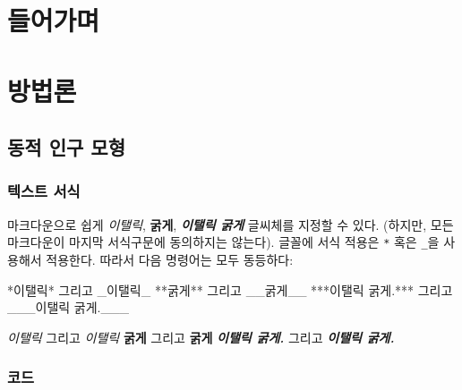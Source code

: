 \documentclass[
  letterpaper,
]{book}
\newenvironment{Shaded}{\begin{snugshade}}{\end{snugshade}}
\newcommand{\AttributeTok}[1]{\textcolor[rgb]{0.40,0.45,0.13}{#1}}
\newcommand{\OtherTok}[1]{\textcolor[rgb]{0.00,0.23,0.31}{#1}}
\begin{document}
\hypertarget{uxb4e4uxc5b4uxac00uxba70}{%
\chapter*{들어가며}\label{uxb4e4uxc5b4uxac00uxba70}}


\hypertarget{uxbc29uxbc95uxb860}{%
\chapter*{방법론}\label{uxbc29uxbc95uxb860}}


\hypertarget{uxb3d9uxc801-uxc778uxad6c-uxbaa8uxd615}{%
\section*{동적 인구 모형}\label{uxb3d9uxc801-uxc778uxad6c-uxbaa8uxd615}}


\hypertarget{uxd14duxc2a4uxd2b8-uxc11cuxc2dd}{%
\subsection{텍스트 서식}\label{uxd14duxc2a4uxd2b8-uxc11cuxc2dd}}

마크다운으로 쉽게 \emph{이탤릭}, \textbf{굵게}, \textbf{\emph{이탤릭
굵게}} 글씨체를 지정할 수 있다. (하지만, 모든 마크다운이 마지막
서식구문에 동의하지는 않는다). 글꼴에 서식 적용은 \texttt{*} 혹은
\texttt{\_}을 사용해서 적용한다. 따라서 다음 명령어는 모두 동등하다:

\begin{Shaded}
\begin{Highlighting}[]
\OtherTok{*이탤릭*}\AttributeTok{ 그리고 \_이탤릭\_}
\OtherTok{**굵게**}\AttributeTok{ 그리고 \_\_굵게\_\_}
\OtherTok{***이탤릭}\AttributeTok{ 굵게.*** 그리고 \_\_\_이탤릭 굵게.\_\_\_}
\end{Highlighting}
\end{Shaded}

\emph{이탤릭} 그리고 \emph{이탤릭} \textbf{굵게} 그리고 \textbf{굵게}
\textbf{\emph{이탤릭 굵게.}} 그리고 \textbf{\emph{이탤릭 굵게.}}

\hypertarget{uxcf54uxb4dc}{%
\subsection{코드}\label{uxcf54uxb4dc}}
\end{document}
